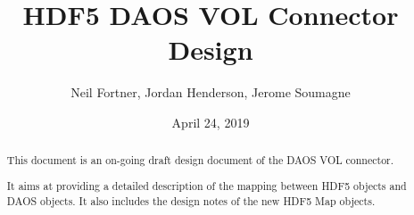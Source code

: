 \documentclass[letterpaper,hyper]{THG_Guide}
\title{HDF5 DAOS VOL Connector Design}
\author{Neil Fortner, Jordan Henderson, Jerome Soumagne}
\date{April 24, 2019}
\begin{document}
\maketitle

\begin{abstract}
This document is an on-going draft design document of the DAOS VOL connector.

It aims at providing a detailed description of the mapping between HDF5 objects and DAOS
objects. It also includes the design notes of the new HDF5 Map objects.
\end{abstract}


\makerevisions

\tableofcontents
\newpage




%
%
\end{document}
